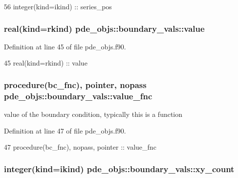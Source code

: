 \begin{DoxyCode}
56     \textcolor{keywordtype}{integer(kind=ikind)} :: series\_pos
\end{DoxyCode}
\subsubsection[{value}]{\setlength{\rightskip}{0pt plus 5cm}real(kind=rkind) pde\+\_\+objs\+::boundary\+\_\+vals\+::value}\label{structpde__objs_1_1boundary__vals_a27d265ff95b1082600acdbf462c4d8be}


Definition at line 45 of file pde\+\_\+objs.\+f90.


\begin{DoxyCode}
45     \textcolor{keywordtype}{real(kind=rkind)}    :: value
\end{DoxyCode}
\subsubsection[{value\+\_\+fnc}]{\setlength{\rightskip}{0pt plus 5cm}procedure({\bf bc\+\_\+fnc}), pointer, nopass pde\+\_\+objs\+::boundary\+\_\+vals\+::value\+\_\+fnc}\label{structpde__objs_1_1boundary__vals_a47d40c66952a74caf2de905332b0a603}


value of the boundary condition, typically this is a function 



Definition at line 47 of file pde\+\_\+objs.\+f90.


\begin{DoxyCode}
47     \textcolor{keywordtype}{procedure}(bc_fnc), \textcolor{keywordtype}{nopass}, \textcolor{keywordtype}{pointer}    :: value\_fnc
\end{DoxyCode}
\subsubsection[{xy\+\_\+count}]{\setlength{\rightskip}{0pt plus 5cm}integer(kind=ikind) pde\+\_\+objs\+::boundary\+\_\+vals\+::xy\+\_\+count}\label{structpde__objs_1_1boundary__vals_a64a66c3b2a827b8d76ab76aa0257d4ed}


